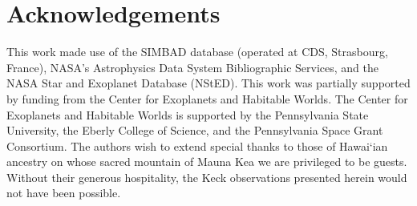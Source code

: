 \documentclass[12pt,preprint]{emulateapj}
\begin{document}
\section*{Acknowledgements}

This work made use of the
SIMBAD database (operated at CDS, Strasbourg, France), NASA's
Astrophysics Data System Bibliographic Services, and the NASA Star and
Exoplanet Database (NStED). This work was partially supported by
funding from the Center for Exoplanets and Habitable Worlds. The
Center for Exoplanets and Habitable Worlds is supported by the
Pennsylvania State University, the Eberly College of Science, and the
Pennsylvania Space Grant Consortium.  The authors wish to
extend special thanks to those of Hawai`ian ancestry on whose sacred
mountain of Mauna Kea we are privileged to be guests. Without their
generous hospitality, the Keck observations presented herein would not
have been possible.

\end{document}
